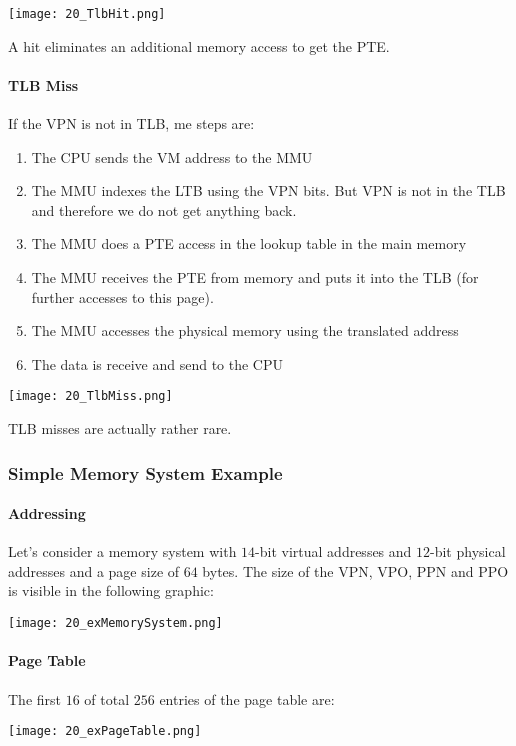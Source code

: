 \texttt{[image: 20\_TlbHit.png]}

A hit eliminates an additional memory access to get the PTE.

\paragraph{TLB Miss}
If the VPN is not in TLB, me steps are:

\begin{enumerate}
    \item The CPU sends the VM address to the MMU
    \item The MMU indexes the LTB using the VPN bits. But VPN is not in the TLB and therefore we do not get anything back.
    \item The MMU does a PTE access in the lookup table in the main memory
    \item The MMU receives the PTE from memory and puts it into the TLB (for further accesses to this page).
    \item The MMU accesses the physical memory using the translated address
    \item The data is receive and send to the CPU
\end{enumerate}

\texttt{[image: 20\_TlbMiss.png]}

TLB misses are actually rather rare.

\subsubsection{Simple Memory System Example}

\paragraph{Addressing}
Let's consider a memory system with $14$-bit virtual addresses and $12$-bit physical addresses and a page size of $64$ bytes. The size of the VPN, VPO, PPN and PPO is visible in the following graphic:

\texttt{[image: 20\_exMemorySystem.png]}

\paragraph{Page Table}
The first $16$ of total $256$ entries of the page table are:

\texttt{[image: 20\_exPageTable.png]}

